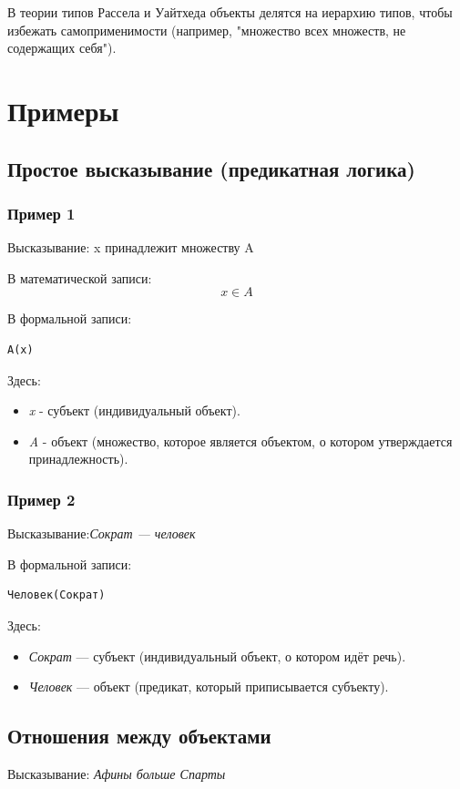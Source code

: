 \documentclass[a4paper, 12pt]{article}
\begin{document}
В теории типов Рассела и Уайтхеда объекты делятся на иерархию типов, чтобы избежать самоприменимости (например, "множество всех множеств, не содержащих себя").

\section{Примеры}

\subsection{Простое высказывание (предикатная логика)}
\subsubsection{Пример 1}
Высказывание: x принадлежит множеству A 

В математической записи:
\[x \in A\]

В формальной записи:
\begin{verbatim}
A(x)
\end{verbatim}

Здесь:
\begin{itemize} 
 \item \textit{x} - субъект (индивидуальный объект). 
 \item \textit{A} - объект (множество, которое является объектом, о котором утверждается принадлежность).
\end{itemize} 

\subsubsection{Пример 2}
Высказывание:\textit{Сократ — человек}

В формальной записи:
\begin{verbatim}
Человек(Сократ)
\end{verbatim}

Здесь:
\begin{itemize} 
 \item \textit{Сократ} — субъект (индивидуальный объект, о котором идёт речь).
 \item \textit{Человек} — объект (предикат, который приписывается субъекту).
\end{itemize} 

\subsection{Отношения между объектами}
Высказывание: \textit{Афины больше Спарты}
\end{document}
